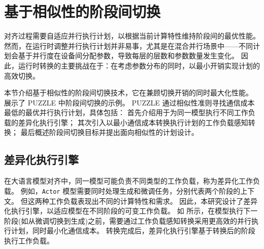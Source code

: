 
\section {基于相似性的阶段间切换}
\label {puzzle:section:inter-stage}

对齐过程需要自适应并行执行计划，以根据当前计算特性维持阶段间的最优性能。
然而，在运行时调整并行执行计划并非易事，尤其是在混合并行场景中——不同计划会基于并行度在设备间分配参数，导致每层的层数和参数数量发生变化。
因此，运行时转换的主要挑战在于：在考虑参数分布的同时，以最小开销实现计划的高效切换。  

本节介绍基于相似性的阶段间切换技术，它在兼顾切换开销的同时最大化性能。
 展示了 PUZZLE 中阶段间切换的示例。
PUZZLE 通过相似性准则寻找通信成本最低的最优并行执行计划，具体包括：
首先介绍用于为同一模型执行不同工作负载的差异化执行引擎；
其次引入以最小通信成本转换执行计划的工作负载感知转换；
最后概述阶段间切换目标并提出面向相似性的计划设计。  


\subsection{差异化执行引擎}
\label{subsection:inter-stage-diff-exec-engine}

在大语言模型对齐中，同一模型可能负责不同类型的工作负载，称为差异化工作负载。
例如，\texttt{Actor} 模型需要同时处理生成和微调任务，分别代表两个阶段的上下文。
但这两种工作负载表现出不同的计算特性和需求。
因此，本研究设计了差异化执行引擎，以适应模型在不同阶段的可变工作负载。
如 所示，在模型执行下一阶段(如从微调切换到生成)之前，需要通过工作负载感知转换采用更高效的并行执行计划，同时最小化通信成本。
转换完成后，差异化执行引擎基于转换后的阶段执行工作负载。  


